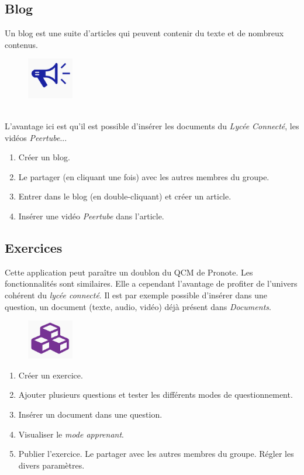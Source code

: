 \documentclass[a4paper,11pt]{article}
\begin{document}
\begin{Form}
\subsection{Blog}
Un blog est une suite d'articles qui peuvent contenir du texte et de nombreux contenus.
\begin{figure}[!h]
\centering
\includegraphics[width=2cm]{ressources/blog.png}
\label{blog}
\end{figure}
\\L'avantage ici est qu'il est possible d'insérer les documents du \emph{Lycée Connecté}, les vidéos \emph{Peertube}...
\begin{activite}
\begin{enumerate}
\item Créer un blog.
\item Le partager (en cliquant une fois) avec les autres membres du groupe.
\item Entrer dans le blog (en double-cliquant) et créer un article.
\item Insérer une vidéo \emph{Peertube} dans l'article.
\end{enumerate}
\end{activite}
\subsection{Exercices}
Cette application peut paraître un doublon du QCM de Pronote. Les fonctionnalités sont similaires. Elle a cependant l'avantage de profiter de l'univers cohérent du \emph{lycée connecté}. Il est par exemple possible d'insérer dans une question, un document (texte, audio, vidéo) déjà présent dans \emph{Documents}.
\begin{figure}[!h]
\centering
\includegraphics[width=2cm]{ressources/exercices.png}
\label{exo}
\end{figure}
\begin{activite}
\begin{enumerate}
\item Créer un exercice.
\item Ajouter plusieurs questions et tester les différents modes de questionnement.
\item Insérer un document dans une question.
\item Visualiser le \emph{mode apprenant}.
\item Publier l'exercice. Le partager avec les autres membres du groupe. Régler les divers paramètres.
\end{enumerate}
\end{activite}


\end{Form}
\end{document}
